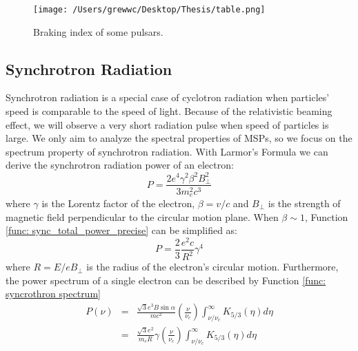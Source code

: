 \documentclass[12pt]{report}
\begin{document}
        \begin{figure}[!ht]
          \centering
          \texttt{[image: /Users/grewwc/Desktop/Thesis/table.png]}
          \caption{Braking index of some pulsars.}
          \label{fig:braking_index}
        \end{figure}
    
        \subsection{Synchrotron Radiation}
          Synchrotron radiation is a special case of cyclotron radiation when particles' 
          speed is comparable to the speed of light. Because of the relativistic beaming 
          effect, we will observe a very short radiation pulse when speed of particles is 
          large. We only aim to analyze the spectral properties of MSPs, so we focus on the 
          spectrum property of synchrotron radiation. 
          With Larmor's Formula we can derive the synchrotron radiation power of an electron:
          \begin{equation}
            \label{func: sync_total_power_precise}
            P = \frac{2e^4\gamma^2\beta^2B_{\perp}^2}{3m_e^2c^3} 
          \end{equation}
          where $\gamma$ is the Lorentz factor of the electron, $\beta=v/c$ and $B_{\perp}$ 
          is the strength of magnetic field perpendicular to the circular motion plane. 
          When $\beta \sim 1$, Function \ref{func: sync_total_power_precise} can be 
          simplified as:
          \begin{equation}
            \label{func: sync_total_power_simplified}
            P = \frac{2}{3}\frac{e^2c}{R^2}\gamma^4
          \end{equation}
          where $R = E / e B_{\perp}$ is the radius of the electron's circular motion. 
          Furthermore, the power spectrum of a single electron  
          can be described by Function \ref{func: syncrothron spectrum}
          \begin{eqnarray}
          \label{func: syncrothron spectrum}
            P\left(\nu\right) &=& \frac{\sqrt{3} e^3 B \sin{\alpha}}{m c^2} 
              \left(\frac{\nu}{\nu_c}\right) \int_{\nu / \nu_c}^{\infty} K_{5/3}\left(\eta \right)d\eta  \nonumber \\
              &=& \frac{\sqrt{3}e^2}{m_eR}\gamma \left(\frac{\nu}{\nu_c}\right) \int_{\nu / \nu_c}^{\infty} K_{5/3}\left(\eta \right)d\eta
          \end{eqnarray}
\end{document}
